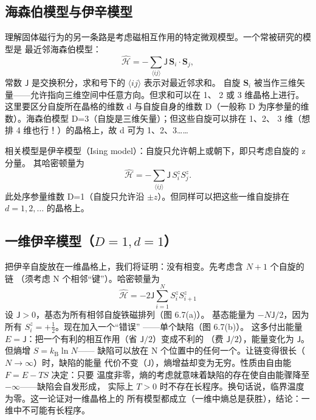\subsection{海森伯模型与伊辛模型}

理解固体磁行为的另一条路是考虑磁相互作用的特定微观模型。一个常被研究的模型是
最近邻海森伯模型：
\begin{equation*}
\hat{\mathcal{H}} = -\sum_{\langle ij\rangle}\mathsf{J}\,\mathbf{S}_i\cdot\mathbf{S}_j,\tag{6.4}
\end{equation*}
常数 $\mathsf{J}$ 是交换积分，求和号下的 $\langle ij\rangle$ 表示对最近邻求和。
自旋 $\mathbf{S}_i$ 被当作三维矢量——允许指向三维空间中任意方向。但求和可以在 1、
2 或 3 维晶格上进行。这里要区分自旋所在晶格的维数 d 与自旋自身的维数 D（一般称
D 为序参量的维数）。海森伯模型 D=3（自旋是三维矢量）；但这些自旋可以排在 1、2、
3 维（想排 4 维也行！）的晶格上，故 d 可为 1、2、3……

相关模型是伊辛模型（Ising model）：自旋只允许朝上或朝下，即只考虑自旋的 z 分量。
其哈密顿量为
\begin{equation*}
\hat{\mathcal{H}} = -\sum_{\langle ij\rangle}\mathsf{J}\,S_i^{z}S_j^{z}.\tag{6.5}
\end{equation*}
此处序参量维数 D=1（自旋只允许沿 $\pm z$）。但同样可以把这些一维自旋排在
$d=1,2,\ldots$ 的晶格上。

\subsection{一维伊辛模型（$D=1, d=1$）}

把伊辛自旋放在一维晶格上，我们将证明：没有相变。先考虑含 $N+1$ 个自旋的链
（须考虑 N 个相邻“键”）。哈密顿量为
\begin{equation*}
\hat{\mathcal{H}} = -2\mathsf{J}\sum_{i=1}^{N}S_i^{z}S_{i+1}^{z}\tag{6.6}
\end{equation*}
设 $\mathsf{J}>0$，基态为所有相邻自旋铁磁排列（图 6.7(a)）。
基态能量为 $-N\mathsf{J}/2$，因为所有 $S_i^{z}=+\frac{1}{2}$。现在加入一个“错误”
——单个缺陷（图 6.7(b)）。
这多付出能量 $E=\mathsf{J}$：把一个有利的相互作用（省 $\mathsf{J}/2$）变成不利的
（费 $\mathsf{J}/2$），能量变化为 $\mathsf{J}$。但熵增 $S=k_{\mathrm{B}}\ln N$——
缺陷可以放在 N 个位置中的任何一个。让链变得很长（$N\to\infty$）时，缺陷的能量
代价不变（$\mathsf{J}$），熵增益却变为无穷。性质由自由能 $F=E-TS$ 决定：只要
温度非零，熵的考虑就意味着缺陷的存在使自由能骤降至 $-\infty$——缺陷会自发形成，
实际上 $T>0$ 时不存在长程序。换句话说，临界温度为零。这一论证对一维晶格上的
所有模型都成立（一维中熵总是获胜），结论：一维中不可能有长程序。

